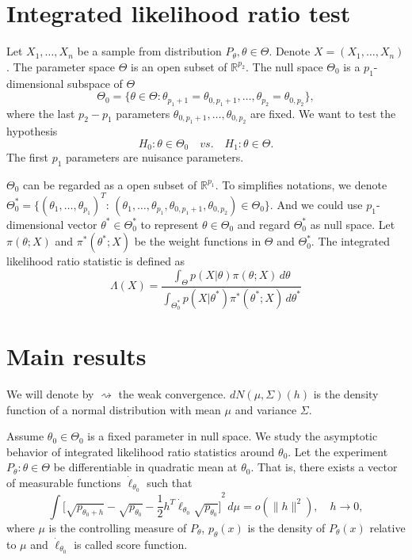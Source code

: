 \documentclass[review]{elsarticle}
\begin{document}
\section{Integrated likelihood ratio test}

Let $X_1,\ldots,X_n$ be a sample from distribution $P_{\theta}, \theta\in\Theta$. Denote $X=(X_1,\ldots,X_n)$. The parameter space $\Theta$ is an open subset of $\mathbb{R}^{p_2}$. The null space $\Theta_0$ is a $p_1$-dimensional subspace of $\Theta$
\begin{equation}
    \Theta_0=\{\theta\in\Theta:\theta_{p_1+1}=\theta_{0,{p_1+1}},\ldots,\theta_{p_2}=\theta_{0,{p_2}}\},
\end{equation}
where the last $p_2-p_1$ parameters $\theta_{0,{p_1+1}},\ldots,\theta_{0,{p_2}}$ are fixed. We want to test the hypothesis
\begin{equation}
H_0:\theta\in \Theta_0\quad vs. \quad H_1:\theta\in \Theta.
\end{equation}
The first $p_1$ parameters are nuisance parameters.

$\Theta_0$ can be regarded as a open subset of $\mathbb{R}^{p_1}$. To simplifies notations, we denote  $\Theta^*_0=\{{(\theta_1,\ldots,\theta_{p_1})}^T:\, (\theta_1,\ldots,\theta_{p_1},\theta_{0,p_1+1},\theta_{0,p_2})\in \Theta_0\}$. And we could use $p_1$-dimensional vector $\theta^*\in
\Theta_0^*$ to represent $\theta\in\Theta_0$ and regard $\Theta_0^*$ as null space.  Let $\pi(\theta;X)$ and $\pi^*(\theta^*;X)$ be the weight functions in $\Theta$ and $\Theta_0^*$. The integrated likelihood ratio statistic is defined as
\begin{equation}\label{likelihoodRatio}
    \Lambda (X)=\frac{\int_{\Theta} p(X|\theta)\pi(\theta;X)\,d\theta}{\int_{\Theta^*_0} p(X|\theta^*)\pi^*(\theta^*;X)\,d\theta^*}
\end{equation}


\section{Main results}

We will denote by $\rightsquigarrow$ the weak convergence. 
$dN(\mu,\Sigma)(h)$ is the density function of a normal distribution with mean $\mu$ and variance $\Sigma$.

Assume $\theta_0\in\Theta_0$ is a fixed parameter in null space. We study the asymptotic behavior of integrated likelihood ratio statistics around $\theta_0$.
Let the experiment $P_\theta : \theta\in \Theta$ be differentiable in quadratic mean at $\theta_0$. That is, there exists a vector of measurable functions $\dot{\ell}_{\theta_0}$ such that
\begin{equation}
    \int {\big[\sqrt{p_{\theta_0+h}}-\sqrt{p_{\theta_0}}-\frac{1}{2}h^T\dot{\ell}_{\theta_0}\sqrt{p_{\theta_0}}\big]}^2\, d\mu=o(\|h\|^2),\quad h\to 0,
\end{equation}
where $\mu$ is the controlling measure of $P_{\theta}$, $p_{\theta}(x)$ is the density of $P_{\theta}(x)$ relative to $\mu$ and $\dot{\ell}_{\theta_0}$ is called score function.
\end{document}
